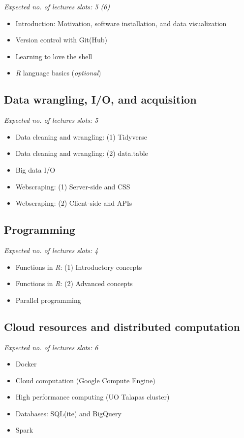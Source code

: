 \documentclass[12]{article}
\begin{document}
\textit{Expected no. of lectures slots: 5 (6)}

\begin{itemize}
	\item Introduction: Motivation, software installation, and data visualization
	\item Version control with Git(Hub)
	\item Learning to love the shell
	\item \textit{R} language basics (\textit{optional})
\end{itemize}

\subsection*{Data wrangling, I/O, and acquisition}

\textit{Expected no. of lectures slots: 5}

\begin{itemize}
	\item Data cleaning and wrangling: (1) Tidyverse
	\item Data cleaning and wrangling: (2) data.table
	\item Big data I/O
	\item Webscraping: (1) Server-side and CSS
	\item Webscraping: (2) Client-side and APIs
\end{itemize}


\subsection*{Programming}

\textit{Expected no. of lectures slots: 4}

\begin{itemize}
	\item Functions in \textit{R}: (1) Introductory concepts
	\item Functions in \textit{R}: (2) Advanced concepts
	\item Parallel programming
\end{itemize}

\subsection*{Cloud resources and distributed computation}

\textit{Expected no. of lectures slots: 6}

\begin{itemize}
	\item Docker
	\item Cloud computation (Google Compute Engine)
	\item High performance computing (UO Talapas cluster) 
	\item Databases: SQL(ite) and BigQuery
	\item Spark
\end{itemize}
\end{document}

